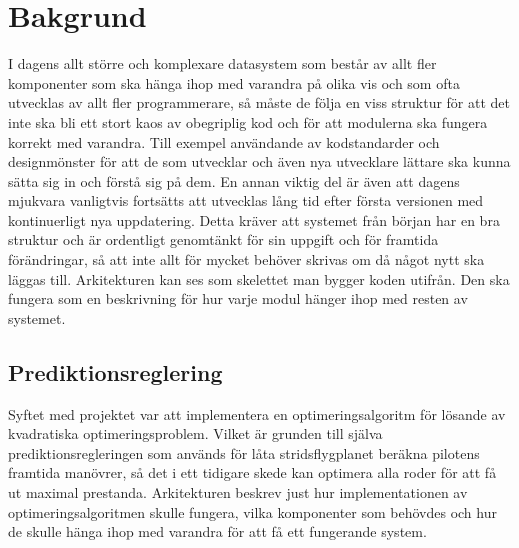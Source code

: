 \section{Bakgrund}
I dagens allt större och komplexare datasystem som består av allt fler komponenter som ska hänga ihop med varandra på olika vis och som ofta utvecklas av allt fler programmerare, så måste de följa en viss struktur för att det inte ska bli ett stort kaos av obegriplig kod och för att modulerna ska fungera korrekt med varandra. Till exempel användande av kodstandarder och designmönster för att de som utvecklar och även nya utvecklare lättare ska kunna sätta sig in och förstå sig på dem.
\newline
\newline
En annan viktig del är även att dagens mjukvara vanligtvis fortsätts att utvecklas lång tid efter första versionen med kontinuerligt nya uppdatering. Detta kräver att systemet från början har en bra struktur och är ordentligt genomtänkt för sin uppgift och för framtida förändringar, så att inte allt för mycket behöver skrivas om då något nytt ska läggas till.
\newline
\newline
Arkitekturen kan ses som skelettet man bygger koden utifrån. Den ska fungera som en beskrivning för hur varje modul hänger ihop med resten av systemet.

\subsection{Prediktionsreglering}
Syftet med projektet var att implementera en optimeringsalgoritm för lösande av kvadratiska optimeringsproblem. Vilket är grunden till själva prediktionsregleringen som används för låta stridsflygplanet beräkna pilotens framtida manövrer, så det i ett tidigare skede kan optimera alla roder för att få ut maximal prestanda.
\newline
\newline
Arkitekturen beskrev just hur implementationen av optimeringsalgoritmen skulle fungera, vilka komponenter som behövdes och hur de skulle hänga ihop med varandra för att få ett fungerande system.

